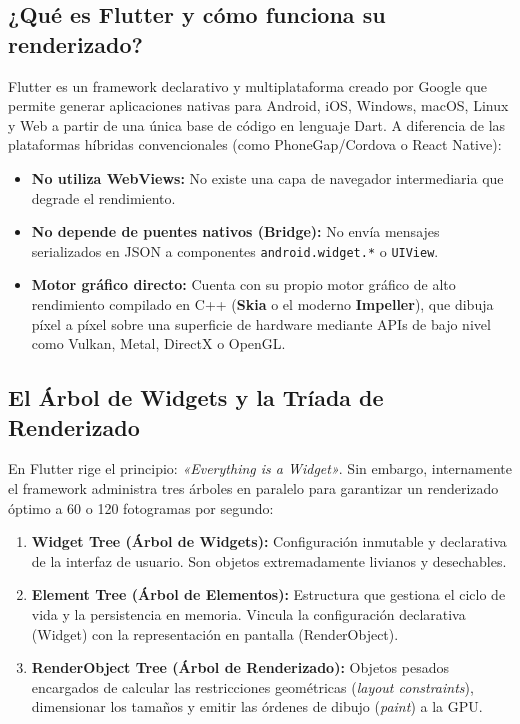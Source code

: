 \documentclass[12pt,a4paper]{article}
\begin{document}
\subsection{¿Qué es Flutter y cómo funciona su renderizado?}
Flutter es un framework declarativo y multiplataforma creado por Google que permite generar aplicaciones nativas para Android, iOS, Windows, macOS, Linux y Web a partir de una única base de código en lenguaje Dart. A diferencia de las plataformas híbridas convencionales (como PhoneGap/Cordova o React Native):
\begin{itemize}[noitemsep]
    \item \textbf{No utiliza WebViews:} No existe una capa de navegador intermediaria que degrade el rendimiento.
    \item \textbf{No depende de puentes nativos (Bridge):} No envía mensajes serializados en JSON a componentes \texttt{android.widget.*} o \texttt{UIView}.
    \item \textbf{Motor gráfico directo:} Cuenta con su propio motor gráfico de alto rendimiento compilado en C++ (\textbf{Skia} o el moderno \textbf{Impeller}), que dibuja píxel a píxel sobre una superficie de hardware mediante APIs de bajo nivel como Vulkan, Metal, DirectX o OpenGL.
\end{itemize}

\subsection{El Árbol de Widgets y la Tríada de Renderizado}
En Flutter rige el principio: \textit{«Everything is a Widget»}. Sin embargo, internamente el framework administra tres árboles en paralelo para garantizar un renderizado óptimo a 60 o 120 fotogramas por segundo:
\begin{enumerate}
    \item \textbf{Widget Tree (Árbol de Widgets):} Configuración inmutable y declarativa de la interfaz de usuario. Son objetos extremadamente livianos y desechables.
    \item \textbf{Element Tree (Árbol de Elementos):} Estructura que gestiona el ciclo de vida y la persistencia en memoria. Vincula la configuración declarativa (Widget) con la representación en pantalla (RenderObject).
    \item \textbf{RenderObject Tree (Árbol de Renderizado):} Objetos pesados encargados de calcular las restricciones geométricas (\textit{layout constraints}), dimensionar los tamaños y emitir las órdenes de dibujo (\textit{paint}) a la GPU.
\end{enumerate}
\end{document}
